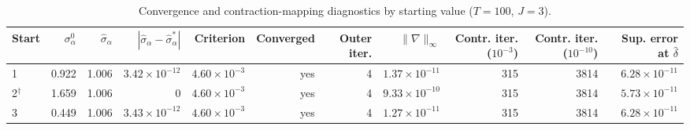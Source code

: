 \begin{table}[H]
\centering\small
\caption{Convergence and contraction-mapping diagnostics by starting value ($T=100$, $J=3$).}\label{tab:q8c_convergence}
\begin{adjustbox}{max width=\linewidth}
\begin{tabular}{lrrrrrrrrrr}
\toprule
Start & $\sigma_\alpha^{0}$ & $\hat\sigma_\alpha$ & $|\hat\sigma_\alpha-\hat\sigma_\alpha^{*}|$ & Criterion & Converged & Outer iter. & $\|\nabla\|_\infty$ & Contr. iter. ($10^{-3}$) & Contr. iter. ($10^{-10}$) & Sup. error at $\hat\delta$ \\
\midrule
1 & 0.922 & 1.006 & $3.42\times 10^{-12}$ & $4.60\times 10^{-3}$ & yes & 4 & $1.37\times 10^{-11}$ & 315 & 3814 & $6.28\times 10^{-11}$ \\
2$^{\dagger}$ & 1.659 & 1.006 & 0 & $4.60\times 10^{-3}$ & yes & 4 & $9.33\times 10^{-10}$ & 315 & 3814 & $5.73\times 10^{-11}$ \\
3 & 0.449 & 1.006 & $3.43\times 10^{-12}$ & $4.60\times 10^{-3}$ & yes & 4 & $1.27\times 10^{-11}$ & 315 & 3814 & $6.28\times 10^{-11}$ \\
\bottomrule
\end{tabular}
\end{adjustbox}
\par{}
\end{table}
